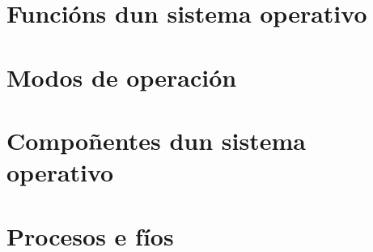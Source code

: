 

\newpage

\section{Funcións dun sistema operativo}


\section{Modos de operación}


\section{Compoñentes dun sistema operativo}




\newpage
\section{Procesos e fíos}


\tableofcontents






